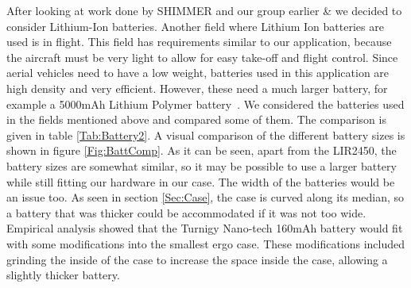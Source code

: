 After looking at work done by SHIMMER and our group earlier \cite{Web:ShimmerHome} \& \cite{drennan2010assessment} we decided to consider Lithium-Ion batteries. Another field where Lithium Ion batteries are used is in flight. This field has requirements similar to our application, because the aircraft must be very light to allow for easy take-off and flight control. Since aerial vehicles need to have a low weight, batteries used in this application are high density and very efficient. However, these need a much larger battery, for example a 5000mAh Lithium Polymer battery~\cite{neitzel2011mobile}. We considered the batteries used in the fields mentioned above and compared some of them. The comparison is given in table \ref{Tab:Battery2}. A visual comparison of the different battery sizes is shown in figure \ref{Fig:BattComp}. As it can be seen, apart from the LIR2450, the battery sizes are somewhat similar,
so it may be possible to use a larger battery while still fitting our hardware in our case.
The width of the batteries would be an issue too.
As seen in section \ref{Sec:Case},
the case is curved along its median,
so a battery that was thicker could be accommodated if it was not too wide.
Empirical analysis showed that the Turnigy Nano-tech 160mAh battery
would fit with some modifications into the smallest ergo case.
These modifications included grinding the inside of the case to increase the space inside the case,
allowing a slightly thicker battery.


